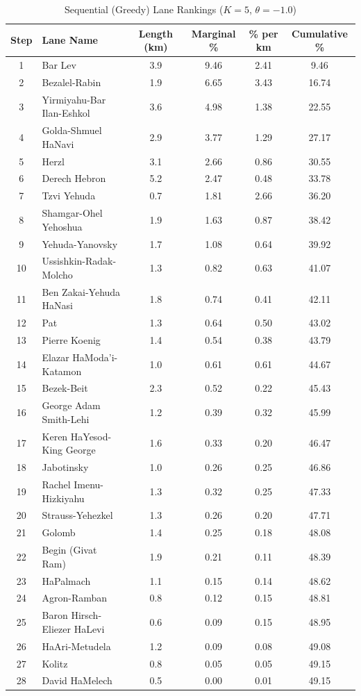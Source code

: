 \begin{table}[H]
\centering
\caption{Sequential (Greedy) Lane Rankings ($K=5$, $\theta=-1.0$)}
\label{tab:sequential_rankings}
\small
\begin{tabular}{@{}clcccc@{}}
\toprule
\textbf{Step} & \textbf{Lane Name} & \textbf{Length (km)} & \textbf{Marginal \%} & \textbf{\% per km} & \textbf{Cumulative \%} \\
\midrule
1 & Bar Lev & 3.9 & 9.46 & 2.41 & 9.46 \\
2 & Bezalel-Rabin & 1.9 & 6.65 & 3.43 & 16.74 \\
3 & Yirmiyahu-Bar Ilan-Eshkol & 3.6 & 4.98 & 1.38 & 22.55 \\
4 & Golda-Shmuel HaNavi & 2.9 & 3.77 & 1.29 & 27.17 \\
5 & Herzl & 3.1 & 2.66 & 0.86 & 30.55 \\
6 & Derech Hebron & 5.2 & 2.47 & 0.48 & 33.78 \\
7 & Tzvi Yehuda & 0.7 & 1.81 & 2.66 & 36.20 \\
8 & Shamgar-Ohel Yehoshua & 1.9 & 1.63 & 0.87 & 38.42 \\
9 & Yehuda-Yanovsky & 1.7 & 1.08 & 0.64 & 39.92 \\
10 & Ussishkin-Radak-Molcho & 1.3 & 0.82 & 0.63 & 41.07 \\
11 & Ben Zakai-Yehuda HaNasi & 1.8 & 0.74 & 0.41 & 42.11 \\
12 & Pat & 1.3 & 0.64 & 0.50 & 43.02 \\
13 & Pierre Koenig & 1.4 & 0.54 & 0.38 & 43.79 \\
14 & Elazar HaModa'i-Katamon & 1.0 & 0.61 & 0.61 & 44.67 \\
15 & Bezek-Beit & 2.3 & 0.52 & 0.22 & 45.43 \\
16 & George Adam Smith-Lehi & 1.2 & 0.39 & 0.32 & 45.99 \\
17 & Keren HaYesod-King George & 1.6 & 0.33 & 0.20 & 46.47 \\
18 & Jabotinsky & 1.0 & 0.26 & 0.25 & 46.86 \\
19 & Rachel Imenu-Hizkiyahu & 1.3 & 0.32 & 0.25 & 47.33 \\
20 & Strauss-Yehezkel & 1.3 & 0.26 & 0.20 & 47.71 \\
21 & Golomb & 1.4 & 0.25 & 0.18 & 48.08 \\
22 & Begin (Givat Ram) & 1.9 & 0.21 & 0.11 & 48.39 \\
23 & HaPalmach & 1.1 & 0.15 & 0.14 & 48.62 \\
24 & Agron-Ramban & 0.8 & 0.12 & 0.15 & 48.81 \\
25 & Baron Hirsch-Eliezer HaLevi & 0.6 & 0.09 & 0.15 & 48.95 \\
26 & HaAri-Metudela & 1.2 & 0.09 & 0.08 & 49.08 \\
27 & Kolitz & 0.8 & 0.05 & 0.05 & 49.15 \\
28 & David HaMelech & 0.5 & 0.00 & 0.01 & 49.15 \\
\bottomrule
\end{tabular}
\end{table}

